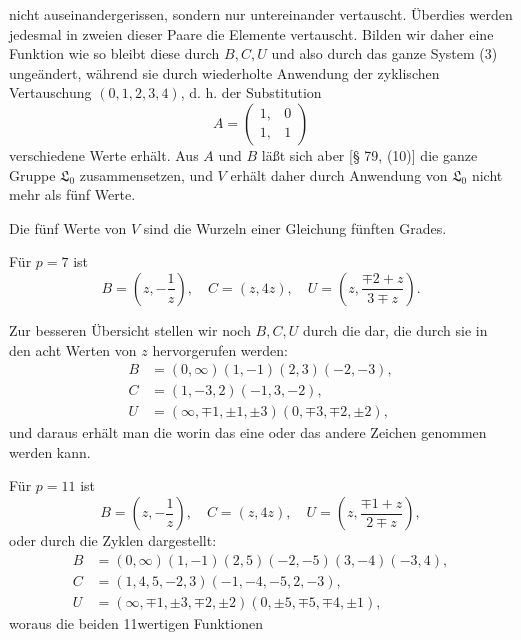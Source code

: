 
nicht auseinandergerissen, sondern nur untereinander vertauscht. Überdies werden jedesmal in zweien dieser Paare die Elemente vertauscht. Bilden wir daher eine Funktion wie
so bleibt diese durch $B, C, U$ und also durch das ganze System (3) ungeändert, während sie durch wiederholte Anwendung der zyklischen Vertauschung $(0, 1, 2, 3, 4)$, d. h. der Substitution
\[
A = \begin{pmatrix} 1, & 0 \\ 1, & 1 \end{pmatrix}
\]
 verschiedene Werte erhält. Aus $A$ und $B$ läßt sich aber [§ 79, (10)] die ganze Gruppe $\mathfrak{L}_0$ zusammensetzen, und $V$ erhält daher durch Anwendung von $\mathfrak{L}_0$ nicht mehr als fünf Werte.

Die fünf Werte von $V$ sind die Wurzeln einer Gleichung fünften Grades.

Für $p = 7$ ist
\[
B = \left(z, -\frac{1}{z}\right), \quad C = (z, 4z), \quad U = \left(z, \frac{\mp 2 + z}{3 \mp z}\right).
\]

Zur besseren Übersicht stellen wir noch $B, C, U$ durch die  dar, die durch sie in den acht Werten von $z$ hervorgerufen werden:
\[
\begin{aligned}
B &= (0, \infty)(1, -1)(2, 3)(-2, -3), \\
C &= (1, -3, 2)(-1, 3, -2), \\
U &= (\infty, \mp 1, \pm 1, \pm 3)(0, \mp 3, \mp 2, \pm 2),
\end{aligned}
\]
und daraus erhält man die 
worin das eine oder das andere Zeichen genommen werden kann.

Für $p = 11$ ist
\[
B = \left(z, -\frac{1}{z}\right), \quad C = (z, 4z), \quad U = \left(z, \frac{\mp 1 + z}{2 \mp z}\right),
\]
oder durch die Zyklen dargestellt:
\[
\begin{aligned}
B &= (0, \infty)(1, -1)(2, 5)(-2, -5)(3, -4)(-3, 4), \\
C &= (1, 4, 5, -2, 3)(-1, -4, -5, 2, -3), \\
U &= (\infty, \mp 1, \pm 3, \mp 2, \pm 2)(0, \pm 5, \mp 5, \mp 4, \pm 1),
\end{aligned}
\]
woraus die beiden 11wertigen Funktionen
